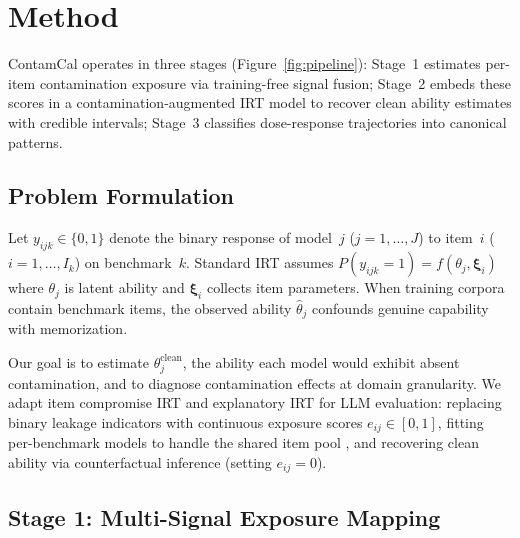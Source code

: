 \section{Method}
\label{sec:method}

ContamCal operates in three stages (Figure~\ref{fig:pipeline}): Stage~1 estimates per-item contamination exposure via training-free signal fusion; Stage~2 embeds these scores in a contamination-augmented IRT model to recover clean ability estimates with credible intervals; Stage~3 classifies dose-response trajectories into canonical patterns.

\subsection{Problem Formulation}
\label{sec:formulation}

Let $y_{ijk} \in \{0,1\}$ denote the binary response of model~$j$ ($j=1,\ldots,J$) to item~$i$ ($i=1,\ldots,I_k$) on benchmark~$k$. Standard IRT assumes $P(y_{ijk}=1) = f(\theta_j, \boldsymbol{\xi}_i)$ where $\theta_j$ is latent ability and $\boldsymbol{\xi}_i$ collects item parameters. When training corpora contain benchmark items, the observed ability $\hat{\theta}_j$ confounds genuine capability with memorization.

Our goal is to estimate $\theta_j^{\text{clean}}$, the ability each model would exhibit absent contamination, and to diagnose contamination effects at domain granularity. We adapt item compromise IRT \citep{eckerly_2017_item_compromise,sinharay_2017_preknowledge} and explanatory IRT \citep{deboeck_2004_explanatory_irt} for LLM evaluation: replacing binary leakage indicators with continuous exposure scores $e_{ij} \in [0,1]$, fitting per-benchmark models to handle the shared item pool \citep{de_ayala_2009_irt}, and recovering clean ability via counterfactual inference (setting $e_{ij}=0$).

\subsection{Stage 1: Multi-Signal Exposure Mapping}
\label{sec:stage1}

